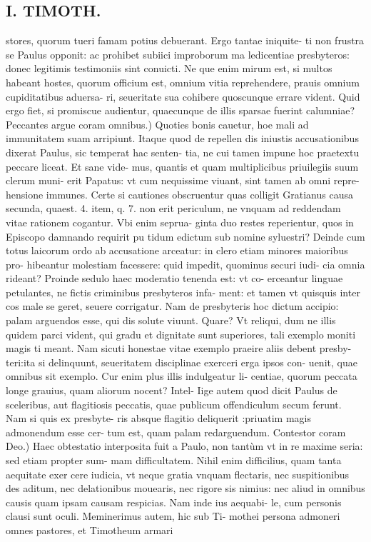 \documentclass{article}
\begin{document}
\begin{pages}
\section*{I. TIMOTH. }
\marginpar{[ p.68 ]}\pstart stores, quorum tueri famam potius debuerant. Ergo tantae iniquite- ti non frustra se Paulus opponit: ac prohibet subiici improborum ma ledicentiae presbyteros: donec legitimis testimoniis sint conuicti. Ne que enim mirum est, si multos habeant hostes, quorum officium est, omnium vitia reprehendere, prauis omnium cupiditatibus aduersa- ri, seueritate sua cohibere quoscunque errare vident. Quid ergo fiet, si promiscue audientur, quaecunque de illis sparsae fuerint calumniae?  \pend\pstart Peccantes argue coram omnibus.) Quoties bonis cauetur, hoe mali ad immunitatem suam arripiunt. Itaque quod de repellen dis iniustis accusationibus dixerat Paulus, sic temperat hac senten- tia, ne cui tamen impune hoc praetextu peccare liceat. Et sane vide- mus, quantis et quam multiplicibus priuilegiis suum clerum muni- erit Papatus: vt cum nequissime viuant, sint tamen ab omni repre- hensione immunes. Certe si cautiones obscruentur quas colligit Gratianus causa secunda, quaest. 4. item, q. 7. non erit periculum, ne vnquam ad reddendam vitae rationem cogantur. Vbi enim seprua- ginta duo restes reperientur, quos in Episcopo damnando requirit pu tidum edictum sub nomine syluestri? Deinde cum totus laicorum ordo ab accusatione arceatur: in clero etiam minores maioribus pro- hibeantur molestiam facessere: quid impedit, quominus securi iudi- cia omnia rideant? Proinde sedulo haec moderatio tenenda est: vt co- erceantur linguae petulantes, ne fictis criminibus presbyteros infa- ment: et tamen vt quisquis inter cos male se geret, seuere corrigatur. Nam de presbyteris hoc dictum accipio: palam arguendos esse, qui dis solute viuunt. Quare? Vt reliqui, dum ne illis quidem parci vident, qui gradu et dignitate sunt superiores, tali exemplo moniti magis ti meant. Nam sicuti honestae vitae exemplo praeire aliis debent presby- teri:ita si delinquunt, seueritatem disciplinae exerceri erga ipsos con- uenit, quae omnibus sit exemplo. Cur enim plus illis indulgeatur li- centiae, quorum peccata longe grauius, quam aliorum nocent? Intel- Iige autem quod dicit Paulus de sceleribus, aut flagitiosis peccatis, quae publicum offendiculum secum ferunt. Nam si quis ex presbyte- ris absque flagitio deliquerit :priuatim magis admonendum esse cer- tum est, quam palam redarguendum.  \pend\pstart Contestor coram Deo.) Haec obtestatio interposita fuit a Paulo, non tantùm vt in re maxime seria: sed etiam propter sum- mam difficultatem. Nihil enim difficilius, quam tanta aequitate exer cere iudicia, vt neque gratia vnquam flectaris, nec suspitionibus des aditum, nec delationibus mouearis, nec rigore sis nimius: nec aliud in omnibus causis quam ipsam causam respicias. Nam inde ius aequabi- le, cum personis clausi sunt oculi. Meminerimus autem, hic sub Ti- mothei persona admoneri omnes pastores, et Timotheum armari  \pend

\end{pages}
\end{document}
